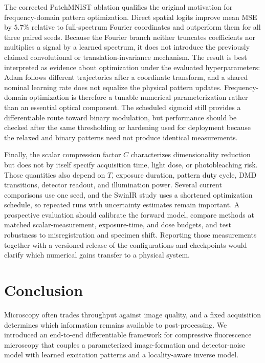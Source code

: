 \documentclass{optica-article}
\begin{document}
The corrected PatchMNIST ablation qualifies the original motivation for frequency-domain pattern optimization. Direct spatial logits improve mean MSE by $5.7\%$ relative to full-spectrum Fourier coordinates and outperform them for all three paired seeds. Because the Fourier branch neither truncates coefficients nor multiplies a signal by a learned spectrum, it does not introduce the previously claimed convolutional or translation-invariance mechanism. The result is best interpreted as evidence about optimization under the evaluated hyperparameters: Adam follows different trajectories after a coordinate transform, and a shared nominal learning rate does not equalize the physical pattern updates. Frequency-domain optimization is therefore a tunable numerical parameterization rather than an essential optical component. The scheduled sigmoid still provides a differentiable route toward binary modulation, but performance should be checked after the same thresholding or hardening used for deployment because the relaxed and binary patterns need not produce identical measurements.

Finally, the scalar compression factor $C$ characterizes dimensionality reduction but does not by itself specify acquisition time, light dose, or photobleaching risk. Those quantities also depend on $T$, exposure duration, pattern duty cycle, DMD transitions, detector readout, and illumination power. Several current comparisons use one seed, and the SwinIR study uses a shortened optimization schedule, so repeated runs with uncertainty estimates remain important. A prospective evaluation should calibrate the forward model, compare methods at matched scalar-measurement, exposure-time, and dose budgets, and test robustness to misregistration and specimen shift. Reporting those measurements together with a versioned release of the configurations and checkpoints would clarify which numerical gains transfer to a physical system.

\section{Conclusion}
\label{sec:conclusion}

Microscopy often trades throughput against image quality, and a fixed acquisition determines which information remains available to post-processing. We introduced an end-to-end differentiable framework for compressive fluorescence microscopy that couples a parameterized image-formation and detector-noise model with learned excitation patterns and a locality-aware inverse model.
\end{document}
